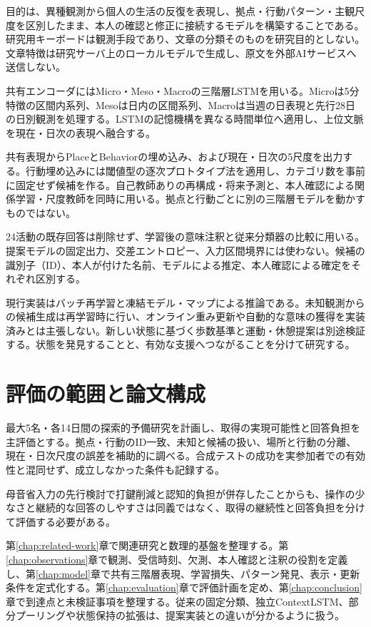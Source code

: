 目的は、異種観測から個人の生活の反復を表現し、拠点・行動パターン・主観尺度を区別したまま、本人の確認と修正に接続するモデルを構築することである。研究用キーボードは観測手段であり、文章の分類そのものを研究目的としない。文章特徴は研究サーバ上のローカルモデルで生成し、原文を外部AIサービスへ送信しない。

共有エンコーダにはMicro・Meso・Macroの三階層LSTMを用いる。Microは5分特徴の区間内系列、Mesoは日内の区間系列、Macroは当週の日表現と先行28日の日別観測を処理する。LSTMの記憶機構を異なる時間単位へ適用し、上位文脈を現在・日次の表現へ融合する\autocite{hochreiter1997lstm}。

共有表現からPlaceとBehaviorの埋め込み、および現在・日次の5尺度を出力する。行動埋め込みには閾値型の逐次プロトタイプ法を適用し、カテゴリ数を事前に固定せず候補を作る。自己教師ありの再構成・将来予測と、本人確認による関係学習・尺度教師を同時に用いる。拠点と行動ごとに別の三階層モデルを動かすものではない。

24活動の既存回答は削除せず、学習後の意味注釈と従来分類器の比較に用いる。提案モデルの固定出力、交差エントロピー、入力区間境界には使わない。候補の識別子（ID）、本人が付けた名前、モデルによる推定、本人確認による確定をそれぞれ区別する。

現行実装はバッチ再学習と凍結モデル・マップによる推論である。未知観測からの候補生成は再学習時に行い、オンライン重み更新や自動的な意味の獲得を実装済みとは主張しない。新しい状態に基づく歩数基準と運動・休憩提案は別途検証する。状態を発見することと、有効な支援へつながることを分けて研究する。

\section{評価の範囲と論文構成}

最大5名・各14日間の探索的予備研究を計画し、取得の実現可能性と回答負担を主評価とする。拠点・行動のID一致、未知と候補の扱い、場所と行動の分離、現在・日次尺度の誤差を補助的に調べる。合成テストの成功を実参加者での有効性と混同せず、成立しなかった条件も記録する。

母音省入力の先行検討で打鍵削減と認知的負担が併存したことからも、操作の少なさと継続的な回答のしやすさは同義ではなく、取得の継続性と回答負担を分けて評価する必要がある。

第\ref{chap:related-work}章で関連研究と数理的基盤を整理する。第\ref{chap:observations}章で観測、受信時刻、欠測、本人確認と注釈の役割を定義し、第\ref{chap:model}章で共有三階層表現、学習損失、パターン発見、表示・更新条件を定式化する。第\ref{chap:evaluation}章で評価計画を定め、第\ref{chap:conclusion}章で到達点と未検証事項を整理する。従来の固定分類、独立ContextLSTM、部分プーリングや状態保持の拡張は、提案実装との違いが分かるように扱う。
